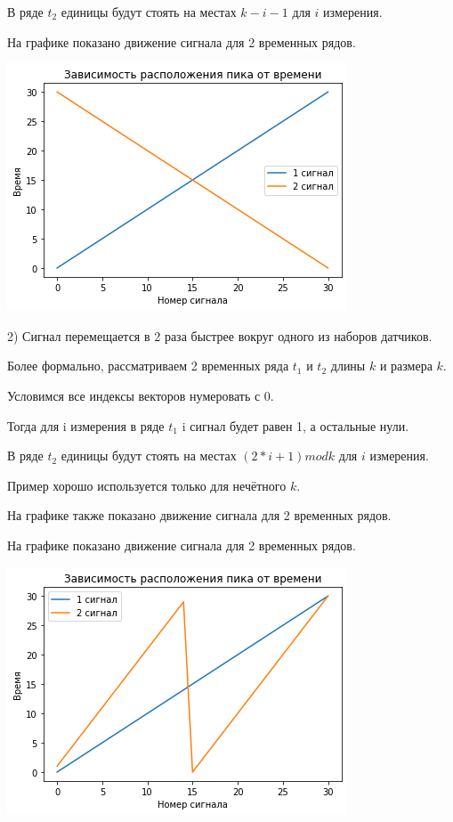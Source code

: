 \documentclass[12pt, twoside]{article}
\begin{document}
В ряде $t_2$ единицы будут стоять на местах $k - i - 1$ для $i$ измерения.


На графике показано движение сигнала для 2 временных рядов.

\includegraphics{rev_signal}

2) Сигнал перемещается в 2 раза быстрее вокруг одного из наборов датчиков.

Более формально, рассматриваем 2 временных ряда $t_1$  и $t_2$ длины $k$ и размера $k$.

Условимся все индексы векторов нумеровать с 0.

Тогда для i измерения в ряде $t_1$ i сигнал будет равен 1, а остальные нули.

В ряде $t_2$ единицы будут стоять на местах $(2 * i + 1) mod k$ для $i$ измерения.

Пример хорошо используется только для нечётного $k$.

На графике также показано движение сигнала для 2 временных рядов.

На графике показано движение сигнала для 2 временных рядов.

\includegraphics{up}
\end{document}
